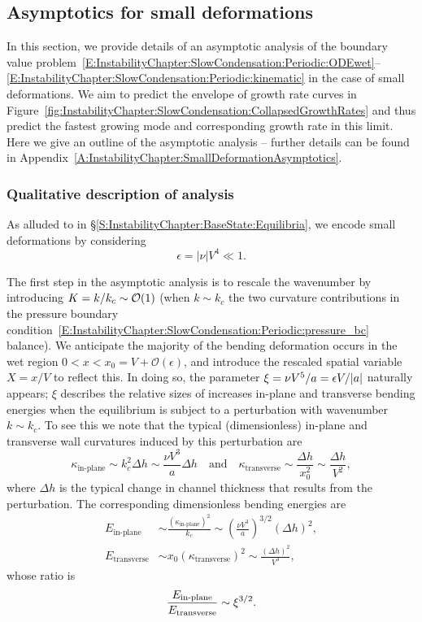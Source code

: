 \subsection{Asymptotics for small deformations}\label{S:InstabilityChapter:NoCondensation:SmallDeformations}
In this section, we provide details of an asymptotic analysis of the boundary value problem~\eqref{E:InstabilityChapter:SlowCondensation:Periodic:ODEwet}--\eqref{E:InstabilityChapter:SlowCondensation:Periodic:kinematic} in the case of small deformations. We aim to predict the envelope of growth rate curves in Figure~\ref{fig:InstabilityChapter:SlowCondensation:CollapsedGrowthRates} and thus predict the fastest growing mode and corresponding growth rate in this limit. Here we give an outline of the asymptotic analysis -- further details can be found in Appendix~\ref{A:InstabilityChapter:SmallDeformationAsymptotics}.

\subsubsection{Qualitative description of analysis}
As alluded to in \S\ref{S:InstabilityChapter:BaseState:Equilibria}, we encode small deformations by considering
\begin{equation}
\epsilon  = |\nu| V^4 \ll 1.
\end{equation}

The first step in the asymptotic analysis is to rescale the wavenumber by introducing $K =k/k_c \sim \mathcal{O}(1)$ (when $k \sim k_c$ the two curvature contributions in the pressure boundary condition~\eqref{E:InstabilityChapter:SlowCondensation:Periodic:pressure_bc} balance). We anticipate the majority of the bending deformation occurs in the wet region $0 < x < x_0 = V + \mathcal{O}(\epsilon)$, and introduce the rescaled spatial variable $X = x/V$ to reflect this. In doing so,  the parameter $\xi = \nu V^5 / a  = \epsilon  V/|a|$ naturally appears; $\xi$ describes the relative sizes of increases in-plane and transverse bending energies when the equilibrium is subject to a perturbation with wavenumber $k \sim k_c$. To see this we note that the typical (dimensionless) in-plane and transverse wall curvatures induced by this perturbation are
\begin{equation}
\kappa_{\text{in-plane}} \sim k_c^2 \Delta h \sim \frac{\nu V^3}{a} \Delta h \quad \text{and}\quad \kappa_{\text{transverse}} \sim \frac{\Delta h}{x_0^2} \sim  \frac{\Delta h}{V^2},
\end{equation}
where $\Delta h$ is the typical change in channel thickness that results from the perturbation. The corresponding dimensionless bending energies are
\begin{align}
E_{\text{in-plane}} &\sim \frac{\left(\kappa_{\text{in-plane}}\right)^2}{k_c} \sim \left( \frac{\nu V^3}{a}\right)^{3/2}(\Delta h)^2,\\ 
E_{\text{transverse}} &\sim x_0 \left(\kappa_{\text{transverse}}\right)^2 \sim \frac{(\Delta h)^2}{V^3},
\end{align}
whose ratio is
\begin{equation}
\frac{E_{\text{in-plane}}}{ E_{\text{transverse}}}
\sim \xi^{3/2}.
\end{equation}

